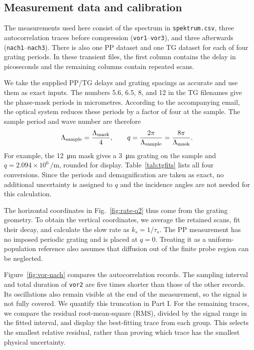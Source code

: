\documentclass[11pt,a4paper]{article}
\begin{document}
\subsection{Measurement data and calibration}
The measurements used here consist of the spectrum in \texttt{spektrum.csv}, three autocorrelation traces before compression (\texttt{vor1}--\texttt{vor3}), and three afterwards (\texttt{nach1}--\texttt{nach3}). There is also one PP dataset and one TG dataset for each of four grating periods. In these transient files, the first column contains the delay in picoseconds and the remaining columns contain repeated scans.

We take the supplied PP/TG delays and grating spacings as accurate and use them as exact inputs. The numbers 5.6, 6.5, 8, and 12 in the TG filenames give the phase-mask periods in micrometres. According to the accompanying email, the optical system reduces these periods by a factor of four at the sample. The sample period and wave number are therefore
\[
\Lambda_{\rm sample}=\frac{\Lambda_{\rm mask}}{4},
\qquad q=\frac{2\pi}{\Lambda_{\rm sample}}
=\frac{8\pi}{\Lambda_{\rm mask}}.
\]
For example, the \SI{12}{\micro\metre} mask gives a \SI{3}{\micro\metre} grating on the sample and $q=2.094\times10^6\,\si{\per\metre}$, rounded for display. Table~\ref{tab:tgfits} lists all four conversions. Since the periods and demagnification are taken as exact, no additional uncertainty is assigned to $q$ and the incidence angles are not needed for this calculation.

The horizontal coordinates in Fig.~\ref{fig:rate-q2} thus come from the grating geometry. To obtain the vertical coordinates, we average the retained scans, fit their decay, and calculate the slow rate as $k_s=1/\tau_s$. The PP measurement has no imposed periodic grating and is placed at $q=0$. Treating it as a uniform-population reference also assumes that diffusion out of the finite probe region can be neglected.

Figure~\ref{fig:vor-nach} compares the autocorrelation records. The sampling interval and total duration of \texttt{vor2} are five times shorter than those of the other records. Its oscillations also remain visible at the end of the measurement, so the signal is not fully covered. We quantify this truncation in Part I. For the remaining traces, we compare the residual root-mean-square (RMS), divided by the signal range in the fitted interval, and display the best-fitting trace from each group. This selects the smallest relative residual, rather than proving which trace has the smallest physical uncertainty.
\end{document}
